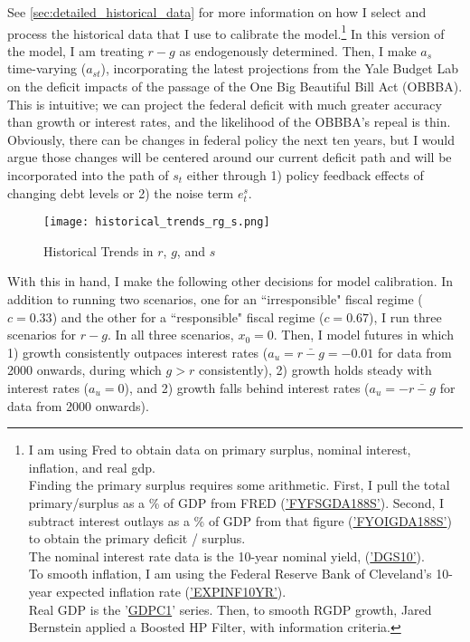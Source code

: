 \documentclass{article}
\begin{document}
See \ref{sec:detailed_historical_data} for more information on how I select and process the historical data that I use to calibrate the model.\footnote{I am using Fred to obtain data on primary surplus, nominal interest, inflation, and real gdp. \\ Finding the primary surplus requires some arithmetic. First, I pull the total primary/surplus as a \% of GDP from FRED (\href{https://fred.stlouisfed.org/series/FYFSGDA188S}{'FYFSGDA188S'}). Second, I subtract interest outlays as a \% of GDP from that figure (\href{FYOIGDA188S}{'FYOIGDA188S'}) to obtain the primary deficit / surplus. \\ The nominal interest rate data is the 10-year nominal yield, (\href{https://fred.stlouisfed.org/series/DGS10}{'DGS10'}). \\ To smooth inflation, I am using the Federal Reserve Bank of Cleveland's 10-year expected inflation rate (\href{http://fred.stlouisfed.org/series/EXPINF10YR}{'EXPINF10YR'}). \\ Real GDP is the '\href{https://fred.stlouisfed.org/series/GDPC1}{GDPC1}' series. Then, to smooth RGDP growth, Jared Bernstein applied a Boosted HP Filter, with information criteria.} In this version of the model, I am treating $r-g$ as endogenously determined. Then, I make $a_s$ time-varying ($a_{st}$), incorporating the latest projections from the Yale Budget Lab on the deficit impacts of the passage of the One Big Beautiful Bill Act (OBBBA). This is intuitive; we can project the federal deficit with much greater accuracy than growth or interest rates, and the likelihood of the OBBBA's repeal is thin. Obviously, there can be changes in federal policy the next ten years, but I would argue those changes will be centered around our current deficit path and will be incorporated into the path of $s_t$ either through 1) policy feedback effects of changing debt levels or 2) the noise term $e_t^s$. 

\begin{figure}[hbt!]
\centering
	\texttt{[image: historical\_trends\_rg\_s.png]}
	\caption{Historical Trends in $r$, $g$, and $s$}
\end{figure}

With this in hand, I make the following other decisions for model calibration. In addition to running two scenarios, one for an ``irresponsible" fiscal regime ($c = 0.33$) and the other for a ``responsible" fiscal regime ($c = 0.67$), I run three scenarios for $r-g$. In all three scenarios, $x_0 = 0$. Then, I model futures in which 1) growth consistently outpaces interest rates ($a_ u = \bar{r - g} = -0.01$ for data from 2000 onwards, during which $g > r$ consistently), 2) growth holds steady with interest rates ($a_u = 0$), and 2) growth falls behind interest rates ($a_u = - \bar{r-g}$ for data from 2000 onwards). 
\end{document}
